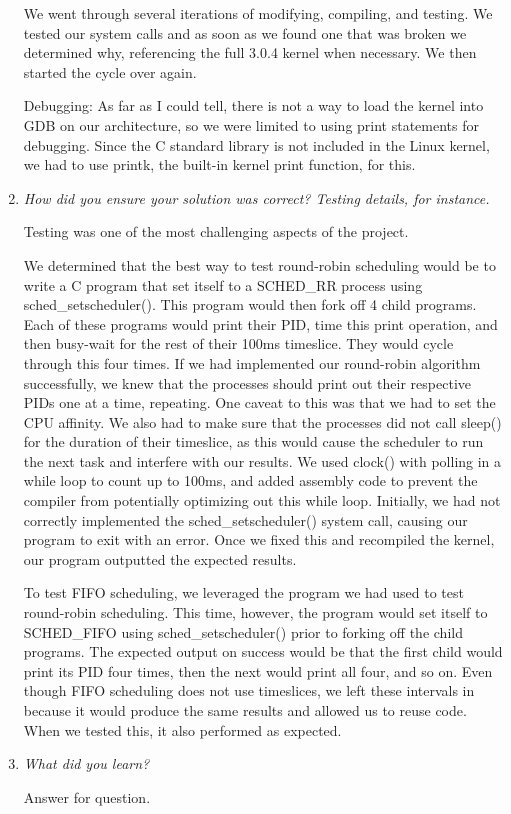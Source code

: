 \documentclass[letterpaper,10pt,titlepage]{article}
\newcommand{\tab}{\hspace*{2em}} %
\begin{document}
\begin{enumerate}
We went through several iterations of modifying, compiling, and testing. We tested our system calls and as soon as we found one that was broken we determined why, referencing the full 3.0.4 kernel when necessary. We then started the cycle over again.

\tab Debugging: As far as I could tell, there is not a way to load the kernel into GDB on our architecture, so we were limited to using print statements for debugging. Since the C standard library is not included in the Linux kernel, we had to use printk, the built-in kernel print function, for this.

\item \emph{How did you ensure your solution was correct? Testing details, for instance.}

\tab Testing was one of the most challenging aspects of the project. 

\tab We determined that the best way to test round-robin scheduling would be to write a C program that set itself to a SCHED_RR process using sched_setscheduler(). This program would then fork off 4 child programs. Each of these programs would print their PID, time this print operation, and then busy-wait for the rest of their 100ms timeslice. They would cycle through this four times. If we had implemented our round-robin algorithm successfully, we knew that the processes should print out their respective PIDs one at a time, repeating. One caveat to this was that we had to set the CPU affinity. We also had to make sure that the processes did not call sleep() for the duration of their timeslice, as this would cause the scheduler to run the next task and interfere with our results. We used clock() with polling in a while loop to count up to 100ms, and added assembly code to prevent the compiler from potentially optimizing out this while loop. Initially, we had not correctly implemented the sched_setscheduler() system call, causing our program to exit with an error. Once we fixed this and recompiled the kernel, our program outputted the expected results.

\tab To test FIFO scheduling, we leveraged the program we had used to test round-robin scheduling. This time, however, the program would set itself to SCHED_FIFO using sched_setscheduler() prior to forking off the child programs. The expected output on success would be that the first child would print its PID four times, then the next would print all four, and so on. Even though FIFO scheduling does not use timeslices, we left these intervals in because it would produce the same results and allowed us to reuse code. When we tested this, it also performed as expected.


\item \emph{What did you learn?}

\tab Answer for question.

\end{enumerate}

%
\end{document}
